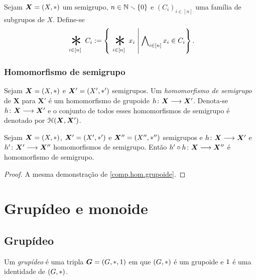 \begin{definition}
Sejam $\bm X=(X,\ast)$ um semigrupo, $n \in \mathbb{N} \smallsetminus \{0\}$ e $(C_i)_{i \in [n]}$ uma família de subgrupos de $X$. Define-se
	\begin{equation*}
	\bigopb _{i \in [n]} C_i := \set{\bigopb _{i \in [n]} x_i}{\forall_{i \in [n]} x_i \in C_i}.
	\end{equation*}
\end{definition}

\subsubsection{Homomorfismo de semigrupo}

\begin{definition}
Sejam $\bm X=(X,\ast)$ e $\bm X'=(X',\ast')$ semigrupos. Um \emph{homomorfismo de semigrupo} de $\bm X$ para $\bm X'$ é um homomorfismo de grupoide ${h}\colon {\bm X} \longrightarrow {\bm X'}$. Denota-se ${h}\colon {\bm X} \longrightarrow {\bm X'}$ e o conjunto de todos esses homomorfismos de semigrupo é denotado por $\mathcal{H}(\bm X,\bm X')$.
\end{definition}

\begin{proposition}
\label{comp.hom.sem}
Sejam $\bm X=(X,\ast)$, $\bm X'=(X',\ast')$ e $\bm X''=(X'',\ast'')$ semigrupos e ${h}\colon {\bm X } \longrightarrow {\bm X'}$ e ${h'}\colon {\bm X'} \longrightarrow {\bm X''}$ homomorfismos de semigrupo. Então ${h' \circ h}\colon {\bm X} \longrightarrow {\bm X''}$ é homomorfismo de semigrupo.
\end{proposition}
\begin{proof}
A mesma demonstração de \ref{comp.hom.grupoide}.
\end{proof}



\section{Grupídeo e monoide}

\subsection{Grupídeo}

\begin{definition}
Um \emph{grupídeo} é uma tripla $\bm G = (G,\ast,1)$ em que $(G,\ast)$ é um grupoide e $1$ é uma identidade de $(G,\ast)$.
\end{definition}

